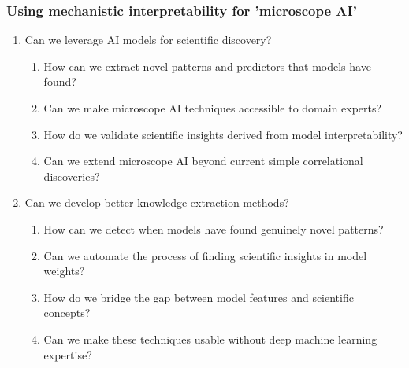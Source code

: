 \subsubsection{Using mechanistic interpretability for 'microscope AI'}
\begin{enumerate}
    \item Can we leverage AI models for scientific discovery?
    \begin{enumerate}[label=\alph*.]
        \item How can we extract novel patterns and predictors that models have found?
        \item Can we make microscope AI techniques accessible to domain experts?
        \item How do we validate scientific insights derived from model interpretability?
        \item Can we extend microscope AI beyond current simple correlational discoveries?
    \end{enumerate}
    
    \item Can we develop better knowledge extraction methods?
    \begin{enumerate}[label=\alph*.]
        \item How can we detect when models have found genuinely novel patterns?
        \item Can we automate the process of finding scientific insights in model weights?
        \item How do we bridge the gap between model features and scientific concepts?
        \item Can we make these techniques usable without deep machine learning expertise?
    \end{enumerate}
\end{enumerate}

